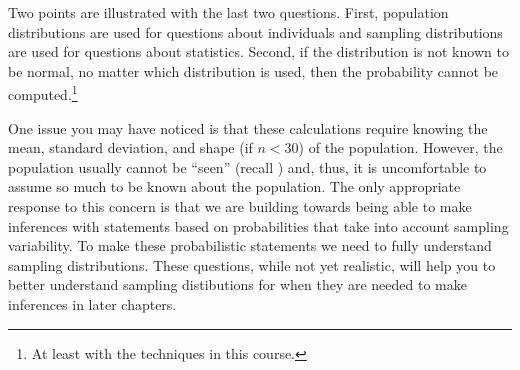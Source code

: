 \documentclass[10pt,openany]{book}\usepackage[]{graphicx}\usepackage[]{color}
\begin{document}
Two points are illustrated with the last two questions.  First, population distributions are used for questions about individuals and sampling distributions are used for questions about statistics.  Second, if the distribution is not known to be normal, no matter which distribution is used, then the probability cannot be computed.\footnote{At least with the techniques in this course.}


\vspace{-12pt}

One issue you may have noticed is that these calculations require knowing the mean, standard deviation, and shape (if $n<30$) of the population.  However, the population usually cannot be ``seen'' (recall ) and, thus, it is uncomfortable to assume so much to be known about the population.  The only appropriate response to this concern is that we are building towards being able to make inferences with statements based on probabilities that take into account sampling variability.  To make these probabilistic statements we need to fully understand sampling distributions.  These questions, while not yet realistic, will help you to better understand sampling distibutions for when they are needed to make inferences in later chapters.
\end{document}
